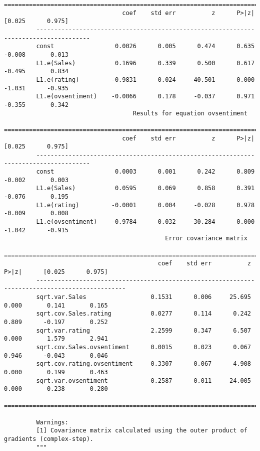 \documentclass[11pt]{article}
\begin{document}
\begin{Verbatim}[commandchars=\\\{\}]
         =====================================================================================
                                 coef    std err          z      P>|z|      [0.025      0.975]
         -------------------------------------------------------------------------------------
         const                 0.0026      0.005      0.474      0.635      -0.008       0.013
         L1.e(Sales)           0.1696      0.339      0.500      0.617      -0.495       0.834
         L1.e(rating)         -0.9831      0.024    -40.501      0.000      -1.031      -0.935
         L1.e(ovsentiment)    -0.0066      0.178     -0.037      0.971      -0.355       0.342
                                    Results for equation ovsentiment                          
         =====================================================================================
                                 coef    std err          z      P>|z|      [0.025      0.975]
         -------------------------------------------------------------------------------------
         const                 0.0003      0.001      0.242      0.809      -0.002       0.003
         L1.e(Sales)           0.0595      0.069      0.858      0.391      -0.076       0.195
         L1.e(rating)         -0.0001      0.004     -0.028      0.978      -0.009       0.008
         L1.e(ovsentiment)    -0.9784      0.032    -30.284      0.000      -1.042      -0.915
                                             Error covariance matrix                                    
         ===============================================================================================
                                           coef    std err          z      P>|z|      [0.025      0.975]
         -----------------------------------------------------------------------------------------------
         sqrt.var.Sales                  0.1531      0.006     25.695      0.000       0.141       0.165
         sqrt.cov.Sales.rating           0.0277      0.114      0.242      0.809      -0.197       0.252
         sqrt.var.rating                 2.2599      0.347      6.507      0.000       1.579       2.941
         sqrt.cov.Sales.ovsentiment      0.0015      0.023      0.067      0.946      -0.043       0.046
         sqrt.cov.rating.ovsentiment     0.3307      0.067      4.908      0.000       0.199       0.463
         sqrt.var.ovsentiment            0.2587      0.011     24.005      0.000       0.238       0.280
         ===============================================================================================
         
         Warnings:
         [1] Covariance matrix calculated using the outer product of gradients (complex-step).
         """
\end{Verbatim}
            
\end{document}

